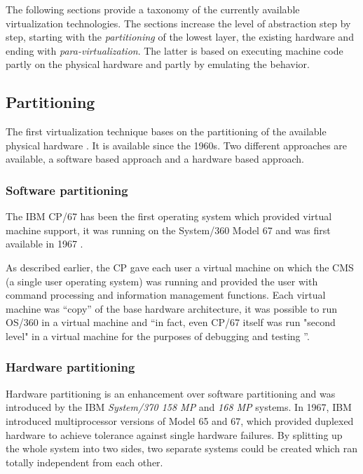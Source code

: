 \bigskip

The  following sections  provide  a taxonomy  of  the currently  available
virtualization   technologies.   The  sections   increase  the   level  of
abstraction  step by step,  starting with  the \emph{partitioning}  of the
lowest   layer,    \ie   the    existing   hardware   and    ending   with
\emph{para-virtualization}. The latter is  based on executing machine code
partly on the physical hardware and partly by emulating the behavior.

\subsection{Partitioning}
\label{sec:vt-partitioning}

The  first  virtualization technique  bases  on  the  partitioning of  the
available physical  hardware \cite{borden89}.   It is available  since the
1960s. Two  different approaches are available, a  software based approach
and a hardware based approach.

\subsubsection{Software partitioning}
\label{sec:softw-part}

The IBM CP/67  has been the first operating  system which provided virtual
machine support, it  was running on the System/360 Model  67 and was first
available in 1967 \cite{borden89}.

As described earlier, the CP gave each user a virtual machine on which the
CMS (a  single user  operating system) was  running and provided  the user
with command processing and information management functions. Each virtual
machine was ``copy'' of the base hardware architecture, it was possible to
run OS/360 in  a virtual machine and ``in fact, even  CP/67 itself was run
"second  level" in a  virtual machine  for the  purposes of  debugging and
testing \cite{borden89}''.

\subsubsection{Hardware partitioning}
\label{sec:hardw-part}

Hardware partitioning is an enhancement over software partitioning and was
introduced  by  the  IBM   \emph{System/370  158  MP}  and  \emph{168  MP}
systems. In 1967,  IBM introduced multiprocessor versions of  Model 65 and
67, which  provided duplexed hardware to achieve  tolerance against single
hardware failures.  By  splitting up the whole system  into two sides, two
separate systems could be created  which ran totally independent from each
other.

